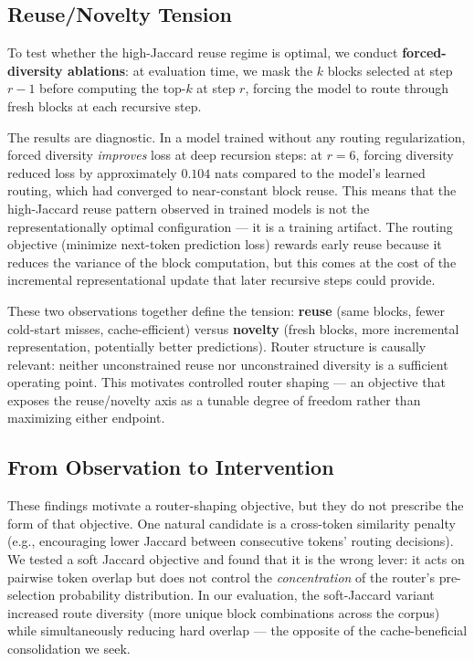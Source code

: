 \subsection{Reuse/Novelty Tension}
\label{sec:tension}

To test whether the high-Jaccard reuse regime is optimal, we conduct
\textbf{forced-diversity ablations}: at evaluation time, we mask the $k$ blocks selected
at step $r{-}1$ before computing the top-$k$ at step $r$, forcing the model to route
through fresh blocks at each recursive step.

The results are diagnostic.
In a model trained without any routing regularization, forced diversity \emph{improves} loss
at deep recursion steps: at $r = 6$, forcing diversity reduced loss by approximately $0.104$
nats compared to the model's learned routing, which had converged to near-constant block
reuse.
This means that the high-Jaccard reuse pattern observed in trained models is not the
representationally optimal configuration --- it is a training artifact.
The routing objective (minimize next-token prediction loss) rewards early reuse because it
reduces the variance of the block computation, but this comes at the cost of the incremental
representational update that later recursive steps could provide.

These two observations together define the tension: \textbf{reuse} (same blocks, fewer
cold-start misses, cache-efficient) versus \textbf{novelty} (fresh blocks, more incremental
representation, potentially better predictions).
Router structure is causally relevant: neither unconstrained reuse nor unconstrained
diversity is a sufficient operating point.
This motivates controlled router shaping --- an objective that exposes the reuse/novelty
axis as a tunable degree of freedom rather than maximizing either endpoint.

\subsection{From Observation to Intervention}
\label{sec:intervention}

These findings motivate a router-shaping objective, but they do not prescribe the form of
that objective.
One natural candidate is a cross-token similarity penalty (e.g., encouraging lower Jaccard
between consecutive tokens' routing decisions).
We tested a soft Jaccard objective and found that it is the wrong lever: it acts on pairwise
token overlap but does not control the \emph{concentration} of the router's pre-selection
probability distribution.
In our evaluation, the soft-Jaccard variant increased route diversity (more unique block
combinations across the corpus) while simultaneously reducing hard overlap --- the opposite
of the cache-beneficial consolidation we seek.

